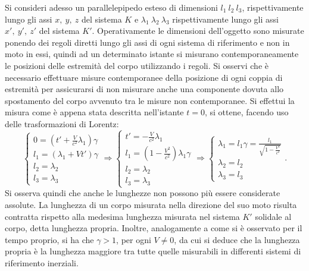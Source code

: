 Si consideri adesso un parallelepipedo esteso di dimensioni $l_1\ l_2\ l_3$, rispettivamente lungo gli assi $x,\ y,\ z$ del sistema $K$ e $\lambda_1\ \lambda_2\ \lambda_3$ rispettivamente lungo gli assi $x',\ y',\ z'$ del sistema $K'$. Operativamente le dimensioni dell'oggetto sono misurate ponendo dei regoli diretti lungo gli assi di ogni sistema di riferimento e non in moto in essi, quindi ad un determinato istante si misurano contemporaneamente le posizioni delle estremità del corpo utilizzando i regoli. Si osservi che è necessario effettuare misure contemporanee della posizione di ogni coppia di estremità per assicurarsi di non misurare anche una componente dovuta allo spostamento del corpo avvenuto tra le misure non contemporanee. Si effettui la misura come è appena stata descritta nell'istante $t=0$, si ottene, facendo uso delle trasformazioni di Lorentz: 
\begin{equation}
    \begin{cases}
        0=(t'+\frac{V}{c^2}\lambda_1)\gamma\\
        l_1=(\lambda_1+Vt')\gamma\\
        l_2=\lambda_2\\
        l_3=\lambda_3
    \end{cases}
    \Rightarrow
    \begin{cases}
        t'=-\frac{V}{c^2}\lambda_1\\
        l_1=(1-\frac{V^2}{c^2})\lambda_1\gamma\\
        l_2=\lambda_2\\
        l_3=\lambda_3
    \end{cases}
    \Rightarrow
    \begin{cases}
        \lambda_1=l_1\gamma=\frac{l_1}{\sqrt{1-\frac{V^2}{c^2}}}\\
        \lambda_2=l_2\\
        \lambda_3=l_3
    \end{cases}.
    \label{contrazioneLunghezze}
\end{equation}   
 Si osserva quindi che anche le lunghezze non possono più essere considerate assolute. La lunghezza di un corpo misurata nella direzione del suo moto risulta contratta rispetto alla medesima lunghezza misurata nel sistema $K'$ solidale al corpo, detta lunghezza propria. Inoltre, analogamente a come si è osservato per il tempo proprio, si ha che $\gamma > 1$, per ogni $V\neq0$, da cui si deduce che la lunghezza propria è la lunghezza maggiore tra tutte quelle misurabili in differenti sistemi di riferimento inerziali.\\
 
